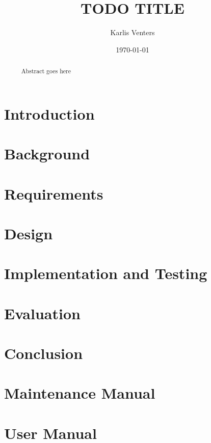 \documentclass{csfourzero}
\title{TODO TITLE}
\author{Karlis Venters}
\date{\today}
\begin{document}
\maketitle
% 

\begin{abstract}~
Abstract goes here
\end{abstract}

\newpage
\tableofcontents{}

\newpage
\listoffigures

\newpage
\section{Introduction}
\label{sec:intro}



\newpage
\section{Background}
\label{sec:literature}




\newpage
\section{Requirements}
\label{sec:requirements}


\newpage
\section{Design}
\label{sec:design}



\newpage
\section{Implementation and Testing}
\label{sec:implementation}



\newpage
\section{Evaluation}
\label{sec:evaluation}



\newpage
\section{Conclusion}
\label{sec:conclusion}


\newpage
\printbibliography

\newpage
\appendix
\section{Maintenance Manual}


\newpage
\section{User Manual}

\end{document}
